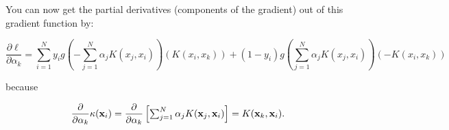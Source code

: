 \documentclass[11pt]{article}
\newcommand{\vx}{{\bf x}}
\newcommand{\pder}[2][]{\frac{\partial#1}{\partial#2}}
\begin{document}
You can now get the partial derivatives (components of the gradient) out of this gradient function by:

\begin{equation}
\pder[\ell]{\alpha_k} = \sum_{i=1}^{N} y_i g\left(-\textstyle \sum_{j=1}^{N} \alpha_j K(x_j, x_i)\right) \left(K(x_i, x_k)\right) 
+ (1 - y_i) g\left(\textstyle \sum_{j=1}^{N} \alpha_j K(x_j, x_i)\right) \left(-K(x_i, x_k)\right) 
\end{equation}

\noindent because

\begin{equation}
\pder{\alpha_k}\kappa(\vx_i)  = \pder{\alpha_k}\left[ \textstyle\sum_{j=1}^N \alpha_j K(\vx_j, \vx_i) \right] = K(\vx_k, \vx_i).
\end{equation}
\end{document}
